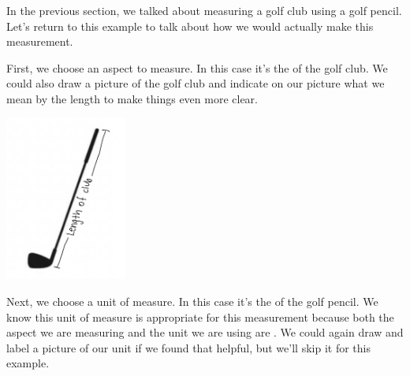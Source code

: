 \documentclass{ximera}
\begin{document}
\begin{example}
In the previous section, we talked about measuring a golf club using a golf pencil. Let's return to this example to talk about how we would actually make this measurement.

First, we choose an aspect to measure. In this case it's the  of the golf club. We could also draw a picture of the golf club and indicate on our picture what we mean by the length to make things even more clear.
\begin{image}
\includegraphics[width=0.3\textwidth]{Club.png}
\end{image}
Next, we choose a unit of measure. In this case it's the  of the golf pencil. We know this unit of measure is appropriate for this measurement because both the aspect we are measuring and the unit we are using are . We could again draw and label a picture of our unit if we found that helpful, but we'll skip it for this example.


\end{example}
\end{document}
